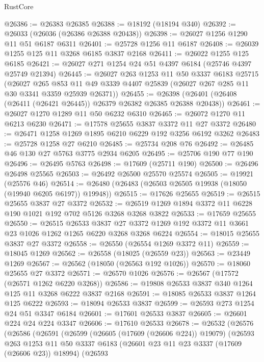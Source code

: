\begin{lexlean}{RustCore}
\begin{coremodule}
@26386 := @26383 @26385
@26388 := @18192 (@18194 @340)
@26392 := @26033 (@26036 (@26386 @26388 @20438))
@26398 := @26027 @1256 @1290 @11 @51 @6187 @6311
@26401 := @25728 @1256 @11 @6187
@26408 := @26039 @1255 @125 @11 @3268 @6185 @3837 @2168
@26411 := @26022 @1255 @125 @6185
@26421 := @26027 @271 @1254 @24 @51 @4397 @6184 (@25746 @4397 @25749 @21394)
@26445 := @26027
    @263
    @1253
    @11
    @50
    @3337
    @6183
    @25715
    (@26027
      @265
      @853
      @11
      @49
      @3339
      @4407
      @25839
      (@26027 @267 @285 @11 @30 @3341 @3359 @25939 @26371))
@26455 := @26398 (@26401 (@26408 (@26411 (@26421 @26445)) @26379 @26382 @26385 @26388 @20438))
@26461 := @26027 @1270 @1289 @11 @50 @6232 @6310
@26465 := @26072 @1270 @11 @6213 @6230
@26471 := @17578 @25655 @3837 @3372 @11 @27 @3372
@26480 := @26471 @1258 @1269 @1895 @6210 @6229 @192 @3256 @6192 @3262
@26483 := @25728 @1258 @27 @6210
@26485 := @25734 @208 @76
@26492 := @26485 @46 @130 @27 @5763 @3775 @2934 @6205
@26495 := @25706 @190 @77 @190
@26496 := @26495 @5763
@26498 := @17609 (@25711 @190)
@26500 := @26496 @26498 @25565
@26503 := @26492 @26500 @25570 @25574
@26505 := @19921 (@25576 @46)
@26514 := @26480 (@26483 (@26503 @26505 @19938 (@18050 (@19940 @6205 @6197)) @19948))
@26515 := @17626 @25655
@26519 := @26515 @25655 @3837 @27 @3372
@26532 := @26519 @1269 @1894 @3372 @11 @6228 @190 @1021 @192 @702 @5126 @3268 @3268 @3822
@26533 := @17659 @25655
@26550 := @26515
    @26533
    @3837
    @27
    @3372
    @1269
    @192
    @3372
    @11
    @3661
    @23
    @1026
    @1262
    @1265
    @6220
    @3268
    @3268
    @6224
@26554 := @18015 @25655 @3837 @27 @3372
@26558 := @26550 (@26554 @1269 @3372 @11)
@26559 := @18045 @1269
@26562 := @26558 (@18025 (@26559 @23))
@26563 := @23449 @1269
@26567 := @26562 (@18050 (@26563 @192 @1026))
@26570 := @18060 @25655 @27 @3372
@26571 := @26570 @1026
@26576 := @26567 (@17572 (@26571 @1262 @6220 @3268))
@26586 := @19808 @26533 @3837 @340 @1264 @125 @11 @3268 @6222 @3837 @2168
@26591 := @18085 @26533 @3837 @1264 @125 @6222
@26593 := @18094 @26533 @3837
@26599 := @26593 @273 @1254 @24 @51 @3347 @6184
@26601 := @17601 @26533 @3837
@26605 := @26601 @224 @24 @224 @3347
@26606 := @17610 @26533
@26678 := @26532
    (@26576
      (@26586
        (@26591
          (@26599
            (@26605 (@17609 (@26606 @224)) @19079)
            (@26593
              @263
              @1253
              @11
              @50
              @3337
              @6183
              (@26601 @23 @11 @23 @3337 (@17609 (@26606 @23)) @18994)
              (@26593

\end{coremodule}
\end{lexlean}
